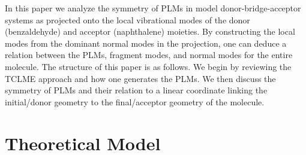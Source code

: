 In this paper we analyze the symmetry of PLMs in model donor-bridge-acceptor systems as projected onto the local
 vibrational modes of the  donor (benzaldehyde)    and  acceptor (naphthalene) moieties.    By constructing the local modes
from the dominant normal modes in the projection,  one can deduce a relation between the PLMs,
fragment modes,  and normal modes for the entire molecule.
The structure of this paper is as follows.
We begin by reviewing the TCLME approach and how one generates the PLMs.  We then
discuss the symmetry  of PLMs and their relation to a linear coordinate linking the
initial/donor geometry to the final/acceptor geometry of the molecule.

\section{Theoretical Model}


